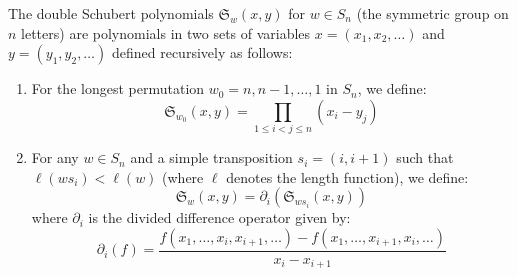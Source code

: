 \documentclass[12pt]{article}
\begin{document}
\begin{definition}
    The double Schubert polynomials $\mathfrak{S}_w(x,y)$ for $w \in S_n$ (the symmetric group on $n$ letters) are polynomials in two sets of variables $x = (x_1, x_2, \ldots)$ and $y = (y_1, y_2, \ldots)$ defined recursively as follows:

    \begin{enumerate}
        \item For the longest permutation $w_0 = n, n-1, \ldots, 1$ in $S_n$, we define:
              \[ \mathfrak{S}_{w_0}(x,y) = \prod_{1 \leq i < j \leq n} (x_i - y_j) \]

        \item For any $w \in S_n$ and a simple transposition $s_i = (i, i+1)$ such that $\ell(ws_i) < \ell(w)$ (where $\ell$ denotes the length function), we define:
              \[ \mathfrak{S}_w(x,y) = \partial_i(\mathfrak{S}_{ws_i}(x,y)) \]
              where $\partial_i$ is the divided difference operator given by:
              \[ \partial_i(f) = \frac{f(x_1, \ldots, x_i, x_{i+1}, \ldots) - f(x_1, \ldots, x_{i+1}, x_i, \ldots)}{x_i - x_{i+1}} \]
    \end{enumerate}
\end{definition}
\end{document}
